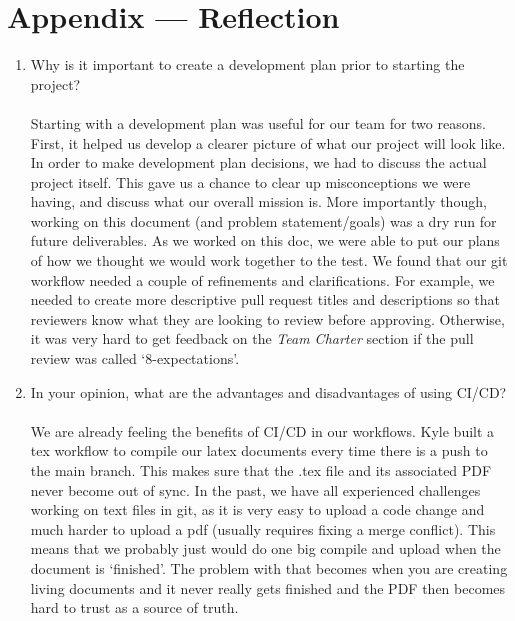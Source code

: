 \documentclass{article}
\begin{document}
\newpage{}

\section*{Appendix --- Reflection}


% 

\begin{enumerate}
    \item Why is it important to create a development plan prior to starting the
    project?\\\\
    Starting with a development plan was useful for our team for two reasons. First, it helped us develop a clearer picture of what our project will look
    like. In order to make development plan decisions, we had to discuss the actual project itself. This gave us a chance to clear up misconceptions
    we were having, and discuss what our overall mission is. More importantly though, working on this document (and problem statement/goals)
    was a dry run for future deliverables. As we worked on this doc, we were able to put our plans of how we thought we would work together to the test. We found 
    that our git workflow needed a couple of refinements and clarifications. For example, we needed to create more descriptive pull request titles and descriptions
    so that reviewers know what they are looking to review before approving. Otherwise, it was very hard to get feedback on the \textit{Team Charter} section if the 
    pull review was called `8-expectations'.
  
    \item In your opinion, what are the advantages and disadvantages of using
    CI/CD?\\\\
    We are already feeling the benefits of CI/CD in our workflows. Kyle built a tex workflow to compile our latex documents every time there is a push to the
    main branch. This makes sure that the .tex file and its associated PDF never become out of sync. In the past, we have all experienced challenges working on
    text files in git, as it is very easy to upload a code change and much harder to upload a pdf (usually requires fixing a merge conflict). This means that
    we probably just would do one big compile and upload when the document is `finished'. The problem with that becomes when you are creating living documents
    and it never really gets finished and the PDF then becomes hard to trust as a source of truth.


\end{enumerate}
\end{document}
